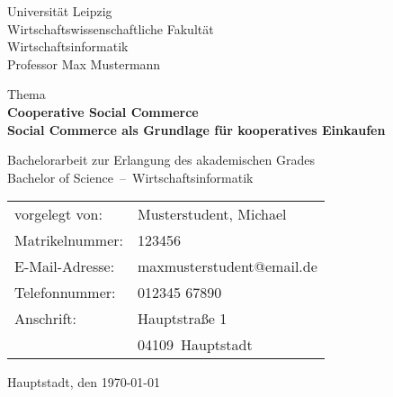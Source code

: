 
\newcommand{\trtitleone}{Cooperative Social Commerce}
\newcommand{\trtitletwo}{Social Commerce als Grundlage für kooperatives Einkaufen}
\newcommand{\trtype}{Bachelorarbeit zur Erlangung des akademischen Grades}
\newcommand{\trabschluss}{Bachelor of Science}
\newcommand{\trauthor}{Musterstudent, Michael}
\newcommand{\trstrasse}{Hauptstraße 1}
\newcommand{\trmatrikelnummer}{123456}
\newcommand{\trplz}{04109}
\newcommand{\trort}{Hauptstadt}
\newcommand{\tremail}{maxmusterstudent@email.de}
\newcommand{\trtelefon}{012345 67890}
\newcommand{\truni}{Universität Leipzig}
\newcommand{\trfakultaet}{Wirtschaftswissenschaftliche Fakultät}
\newcommand{\trfachbereich}{Wirtschaftsinformatik}
\newcommand{\trstudiengang}{Wirtschaftsinformatik}
\newcommand{\trprofessor}{Professor Max Mustermann}

\newcommand{\trdate}{\today}

\thispagestyle{empty}

\truni\\
\trfakultaet\\
\trfachbereich\\
\trprofessor

\vspace{3cm}

\begin{center}
	Thema\\[1cm]
	\textbf{\LARGE \trtitleone}\\[0.1cm]
	\textbf{\large \trtitletwo}
\end{center}

\vspace{0.2cm}

\begin{center}
  \trtype \\
  \trabschluss~--~\trstudiengang \\
\end{center}

\vfill

\begin{table}[htbp]
\begin{tabular}{l l}
vorgelegt von: & \trauthor \\
Matrikelnummer: & \trmatrikelnummer \\
E-Mail-Adresse: & \tremail \\
Telefonnummer: & \trtelefon \\
Anschrift: & \trstrasse \\
& \trplz~\trort \\
\end{tabular}
\end{table}

\vspace{0.25cm}

\trort, den \today
